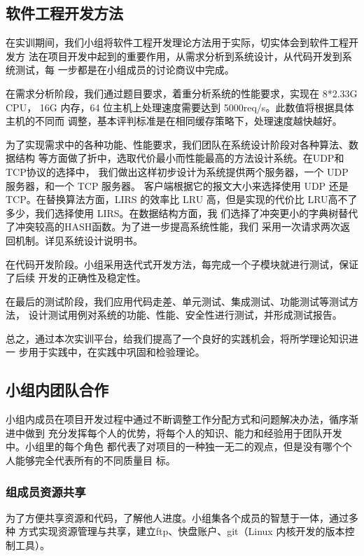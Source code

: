 \documentclass[12pt, a4paper, titlepage]{article}
\begin{document}
\subsection{软件工程开发方法}
\par{在实训期间，我们小组将软件工程开发理论方法用于实际，切实体会到软件工程开发方
	法在项目开发中起到的重要作用，从需求分析到系统设计，从代码开发到系统测试，每
	一步都是在小组成员的讨论商议中完成。	
}
\par{在需求分析阶段，我们通过题目要求，着重分析系统的性能要求，实现在 8*2.33G CPU，
	16G 内存，64 位主机上处理速度需要达到 5000req/s。此数值将根据具体主机的不同而
	调整，基本评判标准是在相同缓存策略下，处理速度越快越好。
}
\par{为了实现需求中的各种功能、性能要求，我们团队在系统设计阶段对各种算法、数据结构
	等方面做了折中，选取代价最小而性能最高的方法设计系统。在UDP和TCP协议的选择中，
	我们做出这样初步设计为系统提供两个服务器，一个 UDP 服务器，和一个 TCP 服务器。
	客户端根据它的报文大小来选择使用 UDP 还是 TCP。在替换算法方面，LIRS 的效率比 
	LRU 高，但是实现的代价比 LRU高不了多少，我们选择使用 LIRS。在数据结构方面，我
	们选择了冲突更小的字典树替代了冲突较高的HASH函数。为了进一步提高系统性能，我们
	采用一次请求两次返回机制。详见系统设计说明书。
}
\par{在代码开发阶段。小组采用迭代式开发方法，每完成一个子模块就进行测试，保证了后续
	开发的正确性及稳定性。	
}
\par{在最后的测试阶段，我们应用代码走差、单元测试、集成测试、功能测试等测试方法，
	设计测试用例对系统的功能、性能、安全性进行测试，并形成测试报告。	
}
\par{总之，通过本次实训平台，给我们提高了一个良好的实践机会，将所学理论知识进一
	步用于实践中，在实践中巩固和检验理论。	
}

\subsection{小组内团队合作}
小组内成员在项目开发过程中通过不断调整工作分配方式和问题解决办法，循序渐进中做到
充分发挥每个人的优势，将每个人的知识、能力和经验用于团队开发中。小组里的每个角色
都代表了对项目的一种独一无二的观点，但是没有哪个个人能够完全代表所有的不同质量目
标。
\subsubsection{组成员资源共享}
\par{为了方便共享资源和代码，了解他人进度。小组集各个成员的智慧于一体，通过多种
方式实现资源管理与共享，建立ftp、快盘账户、git（Linux 内核开发的版本控制工具）。}
\end{document}

